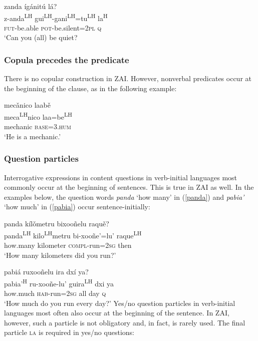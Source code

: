 \ea\label{auxmain}
zanda \'{i}g\'{a}nit\'{u} l\'{a}? \\
z-anda\textsuperscript{LH} gui\textsuperscript{LH}-gani\textsuperscript{LH}=tu\textsuperscript{LH} la\textsuperscript{H} \\
\textsc{fut}-be.able \textsc{pot}-be.silent=\textsc{2pl} \textsc{q} \\
\glt `Can you (all) be quiet?
\z


\subsubsection{Copula precedes the predicate} 

There is no copular construction in ZAI. However, nonverbal predicates occur at the beginning of the clause, as in the following example:

\ea
\glll mec\v{a}nico laab\v{e} \\
meca\textsuperscript{LH}nico laa=be\textsuperscript{LH} \\
mechanic \textsc{base}=\textsc{3.hum} \\
\glt `He is a mechanic.'
\z



\subsubsection{Question particles}

Interrogative expressions in content questions in verb-initial languages most commonly occur at the beginning of sentences. This is true in ZAI as well. In the examples below, the question words \textit{panda} `how many' in (\ref{panda}) and \textit{pabia'} `how much' in (\ref{pabia}) occur sentence-initially:

\ea\label{panda}
panda k\'{i}l\v{o}metru bixooñelu raqu\v{e}?  \\
panda\textsuperscript{LH} kilo\textsuperscript{LH}metru bi-xooñe'=lu' raque\textsuperscript{LH} \\
how.many kilometer \textsc{compl}-run=\textsc{2sg} then \\
\glt `How many kilometers did you run?'
\z

\ea\label{pabia}
pabi\'{a} ruxooñelu ira dx\'{i} ya? \\
pabia'\textsuperscript{H} ru-xooñe-lu' guira\textsuperscript{LH} dxi ya \\
how.much \textsc{hab}-run=\textsc{2sg} all day \textsc{q} \\
\glt `How much do you run every day?'	
\z
Yes/no question particles in verb-initial languages most often also occur at the beginning of the sentence. In ZAI, however, such a particle is not obligatory and, in fact, is rarely used. The final particle \textsc{la} is required in yes/no questions:

